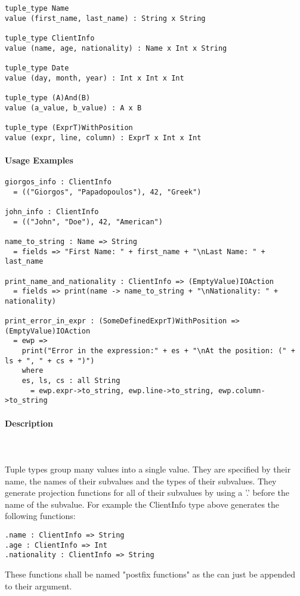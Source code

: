 \documentclass{article}
\def\pend{\mbox{} \\\\}
\begin{document}
\begin{verbatim}
tuple_type Name
value (first_name, last_name) : String x String

tuple_type ClientInfo
value (name, age, nationality) : Name x Int x String

tuple_type Date
value (day, month, year) : Int x Int x Int

tuple_type (A)And(B)
value (a_value, b_value) : A x B

tuple_type (ExprT)WithPosition
value (expr, line, column) : ExprT x Int x Int
\end{verbatim}

\paragraph{Usage Examples}

\begin{verbatim}
giorgos_info : ClientInfo
  = (("Giorgos", "Papadopoulos"), 42, "Greek")

john_info : ClientInfo
  = (("John", "Doe"), 42, "American")

name_to_string : Name => String
  = fields => "First Name: " + first_name + "\nLast Name: " + last_name

print_name_and_nationality : ClientInfo => (EmptyValue)IOAction
  = fields => print(name -> name_to_string + "\nNationality: " + nationality)

print_error_in_expr : (SomeDefinedExprT)WithPosition => (EmptyValue)IOAction
  = ewp =>
    print("Error in the expression:" + es + "\nAt the position: (" + ls + ", " + cs + ")")
    where
    es, ls, cs : all String
      = ewp.expr->to_string, ewp.line->to_string, ewp.column->to_string
\end{verbatim}

\paragraph{Description}\pend
Tuple types group many values into a single value. They are specified by their name,
the names of their subvalues and the types of their subvalues. They generate 
projection functions for all of their subvalues by using a '.' before the name of 
the subvalue. For example the ClientInfo type above generates the following 
functions:
\begin{verbatim}
.name : ClientInfo => String
.age : ClientInfo => Int
.nationality : ClientInfo => String
\end{verbatim}
These functions shall be named "postfix functions" as the can just be appended to
their argument.
\end{document}
